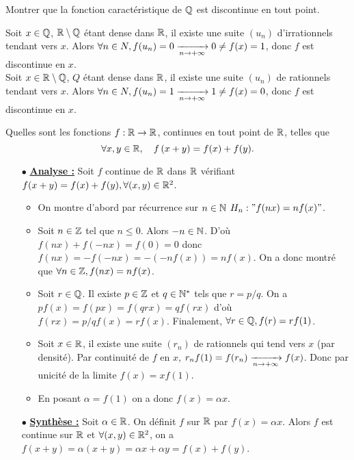\documentclass{magnolia}
\begin{document}
\begin{exos}
\exo Montrer que la fonction caractéristique de $\mathbb{Q}$ est discontinue en
  tout point.
  \begin{sol}
  Soit $x\in \mathbb{Q}$, $\mathbb{R}\setminus\mathbb{Q}$ étant dense dans $\mathbb{R}$, il existe une suite $(u_n)$ d'irrationnels tendant vers $x$. Alors $\forall n \in N, f(u_n)=0\xrightarrow[n\rightarrow +\infty]{}0\neq f(x)=1$, donc $f$ est discontinue en $x$.\\
  Soit $x\in \mathbb{R}\setminus\mathbb{Q}$, $Q$ étant dense dans $\mathbb{R}$, il existe une suite $(u_n)$ de rationnels tendant vers $x$. Alors $\forall n \in N, f(u_n)=1\xrightarrow[n\rightarrow +\infty]{}1\neq f(x)=0$, donc $f$ est discontinue en $x$.
  \end{sol}
\exo Quelles sont les fonctions $f:\mathbb{R}\to\mathbb{R}$, continues en tout point de $\mathbb{R}$, telles que
  \[\forall x,y\in\mathbb{R} ,\quad f\left(x+y\right)=f(x)+f(y).\]
  \begin{sol}
  \begin{itemize}
  \item[$\bullet$] \underline{\textbf{Analyse :}} Soit $f$ continue de $\mathbb{R}$ dans $\mathbb{R}$ vérifiant $f(x+y)=f(x)+f(y), \forall (x,y)\in \mathbb{R}^2$.
  \begin{itemize}
  \item On montre d'abord par récurrence sur $n\in \mathbb{N}$ $H_n : "f(nx)=nf(x)"$.
  \item Soit $n\in \mathbb{Z}$ tel que $n\leq 0$. Alors $-n\in \mathbb{N}$. D'où $f(nx)+f(-nx)=f(0)=0$ donc $f(nx)=-f(-nx)=-(-nf(x))=nf(x)$. On a donc montré que $\forall n \in \mathbb{Z}, f(nx)=nf(x)$.
  \item Soit $r\in \mathbb{Q}$. Il existe $p\in \mathbb{Z}$ et $q\in {\mathbb{N}^*}$ tels que $r=p/q$. On a $pf(x)=f(px)=f(qrx)=qf(rx)$ d'où $f(rx)=p/qf(x)=rf(x)$.
  Finalement, $\forall r\in \mathbb{Q}, f(r)=rf(1)$.
  \item Soit $x\in \mathbb{R}$, il existe une suite $(r_n)$ de rationnels qui tend vers $x$ (par densité). Par continuité de $f$ en $x$, $r_nf(1)=f(r_n)\xrightarrow[n\rightarrow +\infty]{}f(x)$. Donc par unicité de la limite $f(x)=xf(1)$.
  \item En posant $\alpha=f(1)$ on a donc $f(x)=\alpha x$.
  \end{itemize}
  \item[$\bullet$] \underline{\textbf{Synthèse :}} Soit $\alpha \in \mathbb{R}$. On définit $f$ sur $\mathbb{R}$ par $f(x)=\alpha x$. Alors $f$ est continue sur $\mathbb{R}$ et $\forall (x,y)\in \mathbb{R}^2$, on a $f(x+y)=\alpha(x+y)=\alpha x +\alpha y=f(x)+f(y)$.
  \end{itemize}
  \end{sol}
\end{exos}
\end{document}
